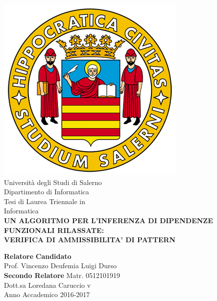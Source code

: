 \begin{center}
    \includegraphics[scale = 0.3]{Immagini/logoUnisa.png}\\
    \vspace{1cm}
    {\Large Università degli Studi di Salerno}\\[0.2truecm]
    {\large Dipartimento di Informatica}\\
    \hrulefill
    \vfill
    {\large Tesi di Laurea Triennale in }\\[0.2truecm]
    {\Large Informatica}\\
    \vfill
    {\large \bf UN ALGORITMO PER L'INFERENZA DI DIPENDENZE FUNZIONALI RILASSATE:}\\
    \vspace{0,5cm}
    {\large \bf VERIFICA DI AMMISSIBILITA' DI PATTERN}
    \vfill\vfill\vfill
    
    
    {\bf Relatore} \hfill {\bf Candidato} \\
    Prof. Vincenzo Deufemia \hfill Luigi Durso \\
    {\bf Secondo Relatore}
    \hfill Matr. 0512101919\\
    
    
    Dott.sa Loredana Caruccio  \hfill {\phantom v} \\
    \vspace{1cm}
    \hrulefill 
    \vfill
    Anno Accademico 2016-2017
\end{center}